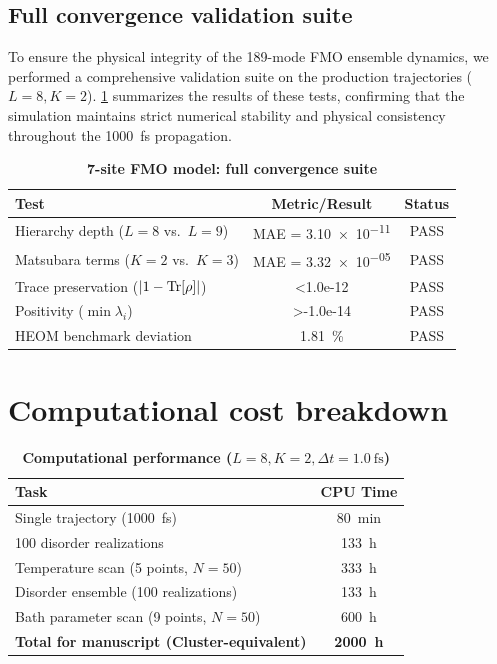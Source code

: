 \documentclass[11pt,a4paper]{article}
\begin{document}
\subsection{Full convergence validation suite}

To ensure the physical integrity of the 189-mode FMO ensemble dynamics, we performed a comprehensive validation suite on the production trajectories ($L=8, K=2$). \cref{tab:SI_7site_convergence} summarizes the results of these tests, confirming that the simulation maintains strict numerical stability and physical consistency throughout the \SI{1000}{\femto\second} propagation.

\begin{table}[h]
\centering
\caption{\textbf{7-site FMO model: full convergence suite}}
\label{tab:SI_7site_convergence}
\begin{tabular}{lcc}
\toprule
\textbf{Test} & \textbf{Metric/Result} & \textbf{Status} \\
\midrule
Hierarchy depth ($L=8$ vs.\ $L=9$) & MAE = \num{3.10e-11} & PASS \\
Matsubara terms ($K=2$ vs.\ $K=3$) & MAE = \num{3.32e-05} & PASS \\
Trace preservation ($\abs{1 - \Tr[\rho]}$) & \num{<1.0e-12} & PASS \\
Positivity ($\min \lambda_i$) & \num{>-1.0e-14} & PASS \\
HEOM benchmark deviation & \SI{1.81}{\percent} & PASS \\
\bottomrule
\end{tabular}
\end{table}


\section{Computational cost breakdown}
\label{sec:S5}

\begin{table}[htb]
\centering
\caption{\textbf{Computational performance ($L=8, K=2, \Delta t=\SI{1.0}{\femto\second}$)}}
\label{tab:SI_performance}
\begin{tabular}{lc}
\toprule
\textbf{Task} & \textbf{CPU Time} \\
\midrule
Single trajectory (\SI{1000}{\femto\second}) & \SI{80}{\minute} \\
100 disorder realizations & \SI{133}{\hour} \\
Temperature scan (5 points, $N=50$) & \SI{333}{\hour} \\
Disorder ensemble (100 realizations) & \SI{133}{\hour} \\
Bath parameter scan (9 points, $N=50$) & \SI{600}{\hour} \\
\midrule
\textbf{Total for manuscript (Cluster-equivalent)} & \textbf{\SI{2000}{\hour}} \\
\bottomrule
\end{tabular}
\end{table}
\end{document}
